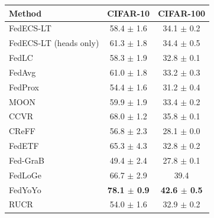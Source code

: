 \begin{tabular}{lcc}
\toprule
Method & CIFAR-10 & CIFAR-100\\
\midrule
FedECS-LT & 58.4 $\pm$ 1.6 & 34.1 $\pm$ 0.2\\
FedECS-LT (heads only) & 61.3 $\pm$ 1.8 & 34.4 $\pm$ 0.5\\
FedLC & 58.3 $\pm$ 1.9 & 32.8 $\pm$ 0.1\\
FedAvg & 61.0 $\pm$ 1.8 & 33.2 $\pm$ 0.3\\
FedProx & 54.4 $\pm$ 1.6 & 31.2 $\pm$ 0.4\\
MOON & 59.9 $\pm$ 1.9 & 33.4 $\pm$ 0.2\\
CCVR & 68.0 $\pm$ 1.2 & 35.8 $\pm$ 0.1\\
CReFF & 56.8 $\pm$ 2.3 & 28.1 $\pm$ 0.0\\
FedETF & 65.3 $\pm$ 4.3 & 32.8 $\pm$ 0.2\\
Fed-GraB & 49.4 $\pm$ 2.4 & 27.8 $\pm$ 0.1\\
FedLoGe & 66.7 $\pm$ 2.9 & 39.4\\
FedYoYo & \textbf{78.1 $\pm$ 0.9} & \textbf{42.6 $\pm$ 0.5}\\
RUCR & 54.0 $\pm$ 1.6 & 32.9 $\pm$ 0.2\\
\bottomrule
\end{tabular}
